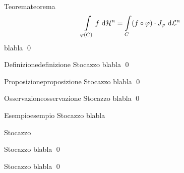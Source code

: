 \documentclass{article}
\begin{document}
\begin{theorem}{Teorema}{teorema}
    \[\intop_{\varphi(C)} f \de \H^n = \intop_{C} (f\circ \varphi) \cdot J_\varphi \de \L^n\]
    \proof
    blabla
    \qed
\end{theorem}

\begin{definition}{Definizione}{definizione}
    Stocazzo
    \proof
    blabla
    \qed
\end{definition}

\begin{proposition}{Proposizione}{proposizione}
    Stocazzo
    \proof
    blabla
    \qed
\end{proposition}

\begin{remark}{Osservazione}{osservazione}
    Stocazzo
    \proof 
    blabla
    \qed
\end{remark}

\begin{example}{Esempio}{esempio}
    Stocazzo
    \solution
    blabla
    \solved
\end{example}

\begin{notation}{}{}
    Stocazzo
\end{notation}

\begin{lemma}{}{}
    Stocazzo
    \proof
    blabla
    \qed
\end{lemma}

\begin{corollary}{}{}
    Stocazzo
    \proof 
    blabla
    \qed
\end{corollary}
\end{document}
